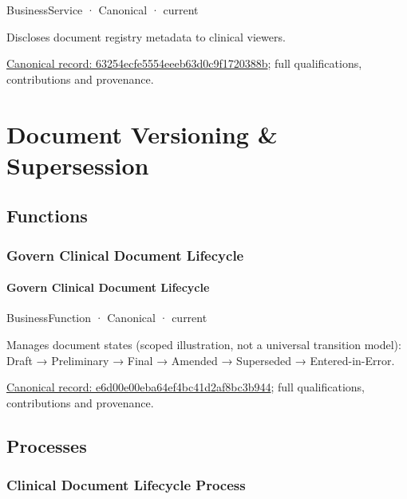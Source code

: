 \label{element:63254ecfe5554eeeb63d0c9f1720388b}
{\small BusinessService · Canonical · current}\par

Discloses document registry metadata to clinical viewers.


{\footnotesize \href{../../../../continuum/business/business-service/63254ecfe5554eeeb63d0c9f1720388b.md}{Canonical record: 63254ecfe5554eeeb63d0c9f1720388b}; full qualifications, contributions and provenance.}\par
\section{Document Versioning \& Supersession}

\subsection{Functions}

\subsubsection{Govern Clinical Document Lifecycle}

\paragraph{Govern Clinical Document Lifecycle}

\label{element:e6d00e00eba64ef4bc41d2af8bc3b944}
{\small BusinessFunction · Canonical · current}\par

Manages document states (scoped illustration, not a universal transition model): Draft → Preliminary → Final → Amended → Superseded → Entered-in-Error.


{\footnotesize \href{../../../../continuum/business/business-function/e6d00e00eba64ef4bc41d2af8bc3b944.md}{Canonical record: e6d00e00eba64ef4bc41d2af8bc3b944}; full qualifications, contributions and provenance.}\par
\subsection{Processes}

\subsubsection{Clinical Document Lifecycle Process}

